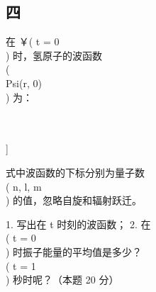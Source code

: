 \subsection{四}
在 ￥( t = 0 \\) 时，氢原子的波函数 \\(\\Psi(r, 0)\\) 为：

\\[\\Psi(r, 0) = \\frac{1}{\\sqrt{10}} \\left[ 2\\psi_{100} + \\psi_{210} + \\sqrt{2}\\psi_{211} + \\sqrt{3}\\psi_{21-1} \\right]\\]

式中波函数的下标分别为量子数 \\( n, l, m \\) 的值，忽略自旋和辐射跃迁。

1. 写出在 t 时刻的波函数；
2. 在 \\( t = 0 \\) 时振子能量的平均值是多少？\\( t = 1 \\) 秒时呢？（本题 20 分）

